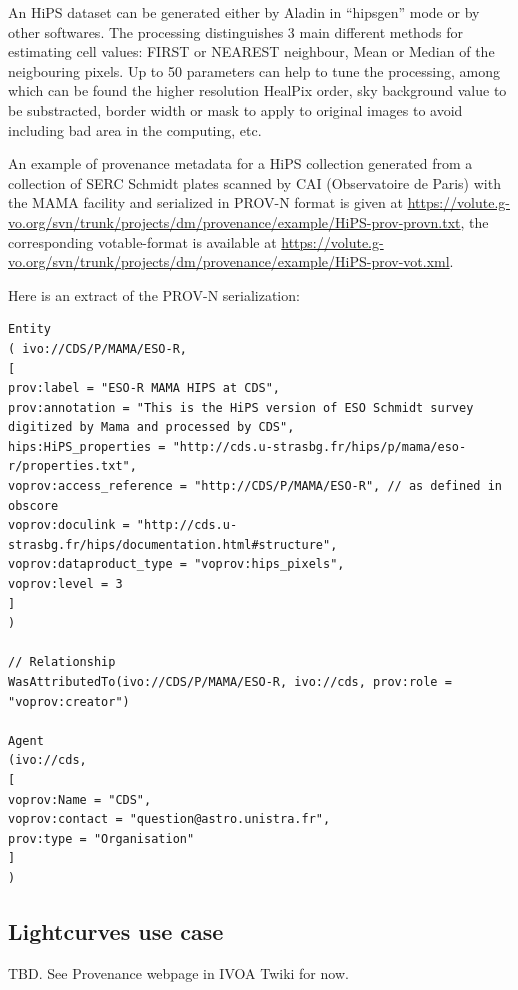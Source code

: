 An HiPS dataset can be generated either by Aladin in ``hipsgen'' mode or by other softwares.  The processing distinguishes 3 main different methods for estimating cell values: FIRST or NEAREST neighbour, Mean or Median of the neigbouring pixels. Up to 50 parameters can help to tune the processing, among which can be found the higher resolution HealPix order, sky background value to be substracted, border width or mask to apply to original images to avoid including bad area in the computing, etc.

An example of provenance metadata for a HiPS collection generated from a collection of SERC Schmidt plates scanned by CAI (Observatoire de Paris) with the MAMA facility and serialized in PROV-N format is given at 
\url{https://volute.g-vo.org/svn/trunk/projects/dm/provenance/example/HiPS-prov-provn.txt}, the corresponding votable-format is available at \url{https://volute.g-vo.org/svn/trunk/projects/dm/provenance/example/HiPS-prov-vot.xml}.

Here is an extract of the PROV-N serialization:

\begin{verbatim}
Entity
( ivo://CDS/P/MAMA/ESO-R, 
[
prov:label = "ESO-R MAMA HIPS at CDS",
prov:annotation = "This is the HiPS version of ESO Schmidt survey digitized by Mama and processed by CDS",
hips:HiPS_properties = "http://cds.u-strasbg.fr/hips/p/mama/eso-r/properties.txt",
voprov:access_reference = "http://CDS/P/MAMA/ESO-R", // as defined in obscore 
voprov:doculink = "http://cds.u-strasbg.fr/hips/documentation.html#structure",
voprov:dataproduct_type = "voprov:hips_pixels",
voprov:level = 3
]
)

// Relationship
WasAttributedTo(ivo://CDS/P/MAMA/ESO-R, ivo://cds, prov:role = "voprov:creator")

Agent
(ivo://cds,
[
voprov:Name = "CDS",
voprov:contact = "question@astro.unistra.fr",
prov:type = "Organisation"
]
)
\end{verbatim}





\subsection{Lightcurves use case}
TBD. See Provenance webpage in IVOA Twiki for now.
